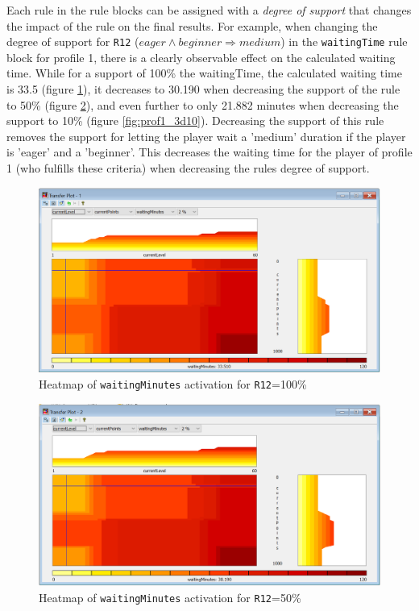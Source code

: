 Each rule in the rule blocks can be assigned with a \textit{degree of support} that changes the impact of the rule on the final results. For example, when changing the degree of support for \texttt{R12} ($eager \wedge beginner \Rightarrow medium $) in the \texttt{waitingTime} rule block for profile 1, there is a clearly observable effect on the calculated waiting time. While for a support of 100\% the waitingTime, the calculated waiting time is 33.5 (figure \ref{fig:prof1_3d100}), it decreases to 30.190 when decreasing the support of the rule to 50\% (figure \ref{fig:prof1_3d50}), and even further to only 21.882 minutes when decreasing the support to 10\% (figure \ref{fig:prof1_3d10}). Decreasing the support of this rule removes the support for letting the player wait a 'medium' duration if the player is 'eager' and a 'beginner'. This decreases the waiting time for the player of profile 1 (who fulfills these criteria) when decreasing the rules degree of support.
 
\begin{figure}[H]
\centering
\includegraphics[width=\textwidth]{img/profile1_r12-100}
\caption{Heatmap of \texttt{waitingMinutes} activation for \texttt{R12}=100\%}
\label{fig:prof1_3d100} 
\end{figure}

\begin{figure}[H]
\centering
\includegraphics[width=\textwidth]{img/profile1_r12-50}
\caption{Heatmap of \texttt{waitingMinutes} activation for \texttt{R12}=50\%}
\label{fig:prof1_3d50} 
\end{figure}

